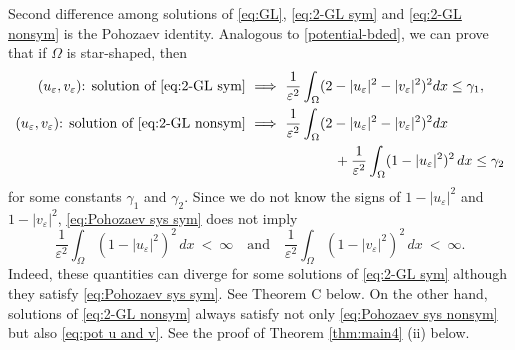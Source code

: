 \documentclass[a4paper,10pt,reqno]{amsart}
\theoremstyle{definition}
\newcommand{\ga}{{\gamma}}
\newcommand{\ve}{{\varepsilon}}
\newcommand{\Om}{{\Omega}}
\newcommand{\qand}{{\quad \mbox{and} \quad}}
\numberwithin{equation}{section}
\begin{document}
Second difference among solutions  of  \eqref{eq:GL}, \eqref{eq:2-GL sym} and \eqref{eq:2-GL nonsym} is the Pohozaev identity.
Analogous to \eqref{potential-bded}, we can prove that if $\Om$ is star-shaped, then
\begin{align}
\label{eq:Pohozaev sys sym}
\text{$(u_\ve,v_\ve)$: solution of \eqref{eq:2-GL sym}} ~ & \Longrightarrow ~
 \frac{1}{ \ve^2}\int_\Om   (2-|u_\ve|^2-|v_\ve|^2)^2 dx \le \ga_1 ,\\
\nonumber
\text{$(u_\ve,v_\ve)$: solution of \eqref{eq:2-GL nonsym}} ~ & \Longrightarrow ~
 \frac{1}{ \ve^2}\int_\Om   (2-|u_\ve|^2-|v_\ve|^2)^2 dx  \\
\label{eq:Pohozaev sys nonsym}
 &\qquad \qquad\qquad+ \frac{1}{ \ve^2}\int_\Om (1-|u_\ve|^2)^2 \,dx \le \ga_2
 \end{align}
for some constants $\ga_1$ and $\ga_2$.
Since we do not know the signs of $1-|u_\ve|^2$ and $1-|v_\ve|^2$, \eqref{eq:Pohozaev sys sym} does not imply
\begin{equation}\label{eq:pot u and v}
 \frac{1}{ \ve^2}\int_\Om (1-|u_\ve|^2)^2 \,dx~<~\infty \qand   \frac{1}{ \ve^2}\int_\Om (1-|v_\ve|^2)^2 \,dx~<~\infty .
\end{equation}
Indeed, these quantities can diverge for some solutions of \eqref{eq:2-GL sym} although they satisfy   \eqref{eq:Pohozaev sys sym}.
See Theorem C below.
On the other hand,   solutions of \eqref{eq:2-GL nonsym} always satisfy not only \eqref{eq:Pohozaev sys nonsym} but also \eqref{eq:pot u and v}.
See the proof of Theorem \ref{thm:main4} (ii) below.
\end{document}
